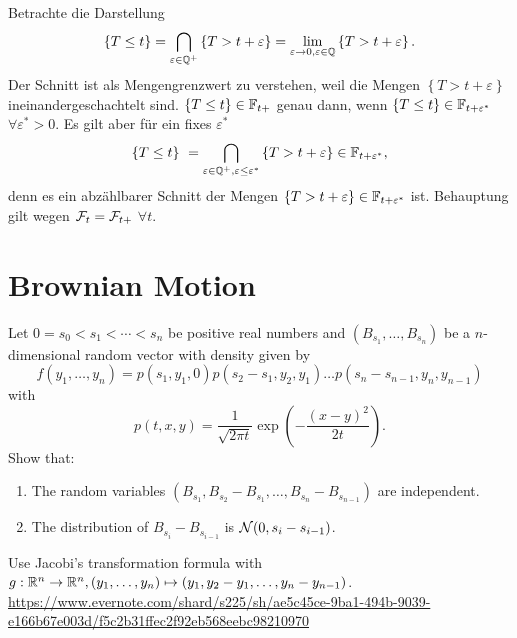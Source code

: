 \solution  Betrachte die Darstellung
\begin{eqnarray}
    \left\{ T \leq t \right\} = \bigcap_{\varepsilon\in\mathbb Q^{+}} \left\{ T > t+\varepsilon \right\}
    = \lim_{\varepsilon\to 0, \varepsilon\in\mathbb Q} \left\{ T > t+\varepsilon \right\}.
\end{eqnarray}
Der Schnitt ist als Mengengrenzwert zu verstehen, weil die Mengen $\left\{ T >
t+\varepsilon \right\}$ ineinandergeschachtelt sind. $\left\{ T \leq t \right\}\in \mathbb F_{t+}$
genau dann, wenn $\left\{ T \leq t \right\}\in \mathbb F_{t+\varepsilon^{*}}$ $\forall \varepsilon^{*}>0$.
Es gilt aber für ein fixes $\varepsilon^{*}$
\begin{equation}
    \left\{ T \leq t \right\}\ = 
    \bigcap_{\varepsilon\in\mathbb Q^{+}, \varepsilon\leq \varepsilon^{*}} \left\{ T > t+\varepsilon \right\} 
    \in\mathbb F_{t+\varepsilon^{*}},
\end{equation}
denn es ein abzählbarer Schnitt der Mengen $\left\{ T> t+\varepsilon
\right\}\in\mathbb F_{t+\varepsilon^{*}}$ ist. Behauptung gilt wegen $\mathcal F_t=\mathcal F_{t+}$ $\forall t$.


\section{Brownian Motion}

Let $0=s_0 < s_1 < \cdots < s_n$ be positive real numbers and $(B_{s_{1}},\dots ,B_{s_n})$ 
be a $n$-dimensional random vector with density given by
\begin{equation*}
    f(y_1,\dots ,y_n) = p(s_1, y_1, 0)p(s_2-s_1,y_2, y_1)\dots p(s_n-s_{n-1}, y_n, y_{n-1})
\end{equation*}
with 
\begin{equation*}
    p(t, x,y ) = \frac{1}{\sqrt{2\pi t}} \exp(-\frac{(x-y)^2}{2t}). 
\end{equation*}
Show that:
\begin{enumerate}
    \item The random variables $(B_{s_1}, B_{s_2}-B_{s_1},\dots ,B_{s_n}-B_{s_{n-1}})$ 
        are independent.
    \item The distribution of $B_{s_i}-B_{s_{i-1}}$ is $\mathcal N(0, s_{i}-s_{i-1})$.
\end{enumerate}

\solution Use Jacobi's transformation formula with
$g:\mathbb R^{n}\to\mathbb R^{n}, (y_1,\dots ,y_n)\mapsto(y_1, y_2-y_1,\dots
,y_n-y_{n-1})$. 
\url{https://www.evernote.com/shard/s225/sh/ae5c45ce-9ba1-494b-9039-e166b67e003d/f5c2b31ffec2f92eb568eebc98210970}



